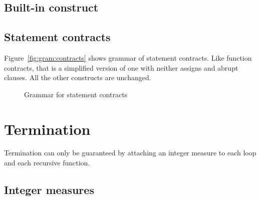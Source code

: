 
\subsection{Built-in construct \texorpdfstring{\at}{\textbackslash{}at}}
\label{sec:at}
\nodiff


\subsection{Statement contracts}
\label{sec:statement_contract}


Figure~\ref{fig:gram:contracts} shows grammar of statement contracts. Like
function contracts, that is a simplified version of \acsl one with neither
assigns and abrupt clauses. All the other constructs are unchanged.

\begin{figure}[htbp]
  \begin{cadre}
    
  \end{cadre}
  \caption{Grammar for statement contracts}
  \label{fig:gram:stcontracts}
\end{figure}


\section{Termination}
\label{sec:termination}


Termination can only be guaranteed by attaching an integer measure to each loop
and each recursive function.


\subsection{Integer measures}
\label{sec:integermeasures}
\nodiff

